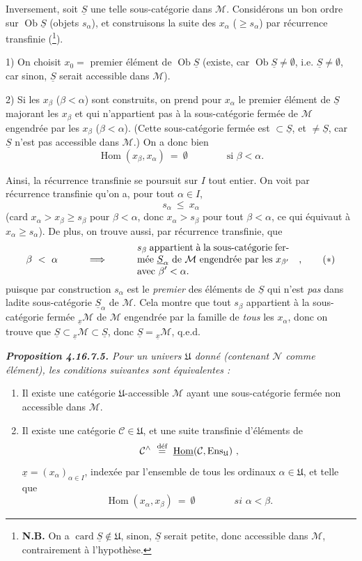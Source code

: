 \documentclass[11pt]{article}
\newcommand{\printedpage}[1]{\marginpar{\footnotesize p.~#1}}
\newcommand{\msp}[1]{\marginpar{\footnotesize [#1]}}
\newcommand{\Ob}{\operatorname{Ob}}
\newcommand{\Hom}{\operatorname{Hom}}
\newcommand{\card}{\operatorname{card}}
\newcommand{\cM}{\mathcal{M}}
\newcommand{\cC}{\mathcal{C}}
\newcommand{\uS}{\underline{S}}
\newcommand{\U}{\mathfrak{U}}
\begin{document}
Inversement, soit $\uS$ une telle sous-catégorie dans $\cM$. Considérons un bon ordre sur $\Ob \uS$ (objets $s_\alpha$), et construisons la suite des $x_\alpha$ ($\geqslant s_\alpha$) par récurrence transfinie (\footnote{\textbf{N.B.} On a $\card \uS \notin \U$, sinon, $\uS$ serait petite, donc accessible dans $\cM$, contrairement à l'hypothèse.}).

1) On choisit $x_0 =$ premier élément de $\Ob \uS$ (existe, car $\Ob \uS \neq \emptyset$, i.e. $\uS \neq \emptyset$, car sinon, $\uS$ serait accessible dans $\cM$).

2) Si les $x_\beta$ ($\beta < \alpha$) sont construits, on prend pour $x_\alpha$ le premier élément de $\uS$ majorant les $x_\beta$ et qui n'appartient pas à la sous-catégorie fermée de $\cM$ engendrée par les $x_\beta$ ($\beta < \alpha$). (Cette sous-catégorie fermée est $\subset \uS$, et $\neq \uS$, car $\uS$ n'est pas accessible dans $\cM$.) On a donc bien
\[
\Hom(x_\beta, x_\alpha) \ =\ \emptyset \qquad\qquad \text{si } \beta < \alpha.
\]

\printedpage{187}

\msp{page 483}
Ainsi, la récurrence transfinie se poursuit sur $I$ tout entier. On voit par récurrence transfinie qu'on a, pour tout $\alpha \in I$,
\[
s_\alpha \ \leqslant\ x_\alpha
\]
(card $x_\alpha > x_\beta \geqslant s_\beta$ pour $\beta < \alpha$, donc $x_\alpha > s_\beta$ pour tout $\beta < \alpha$, ce qui équivaut à $x_\alpha \geqslant s_\alpha$). De plus, on trouve aussi, par récurrence transfinie, que
\[
\beta \ <\ \alpha \qquad\quad \Longrightarrow \qquad\quad
\text{\parbox[c]{5.5cm}{$s_\beta$ appartient à la sous-catégorie fermée $\uS_\alpha$ de $\cM$ engendrée par les $x_{\beta'}$ avec $\beta' < \alpha$.}}
\quad ,
\tag*{$(*)$}
\]
puisque par construction $s_\alpha$ est le \textit{premier} des éléments de $\uS$ qui n'est \textit{pas} dans ladite sous-catégorie $\uS_\alpha$ de $\cM$. Cela montre que tout $s_\beta$ appartient à la sous-catégorie fermée ${}_{\underline{x}}\cM$ de $\cM$ engendrée par la famille de \textit{tous} les $x_\alpha$, donc on trouve que $\uS \subset {}_{\underline{x}}\cM \subset \uS$, donc $\uS = {}_{\underline{x}}\cM$, q.e.d.

\begingroup\itshape
\noindent\textbf{\upshape Proposition 4.16.7.5.} Pour un univers $\U$ donné (contenant $\mathcal{N}$ comme élément), les conditions suivantes sont équivalentes :
\begin{enumerate}[label={}]
\item[1)] Il existe une catégorie $\U$-accessible $\cM$ ayant une sous-catégorie fermée non accessible %
\msp{page 484}
dans $\cM$.
\item[b)] Il existe une catégorie $\cC \in \U$, et une suite transfinie d'éléments de
\[
\cC^\wedge \ \overset{\text{\upshape déf}}{=}\ \underline{\mathrm{Hom}}(\cC, \mathrm{Ens}_{\U}) \ ,
\]
$\underline{x} = (x_\alpha)_{\alpha\in I}$, indexée par l'ensemble de tous les ordinaux $\alpha \in \U$, et telle que
\[
\Hom(x_\alpha, x_\beta) \ =\ \emptyset \qquad\qquad \textit{si } \alpha < \beta.
\]
\end{enumerate}
\endgroup
\end{document}
